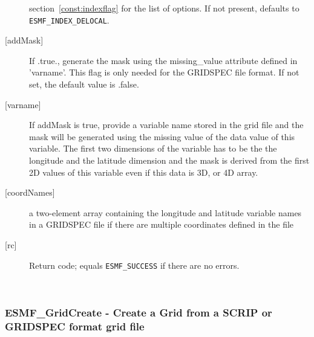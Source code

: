 \begin{description}
        section~\ref{const:indexflag} for the list of options. If not present,
        defaults to {\tt ESMF\_INDEX\_DELOCAL}.
   \item[{[addMask]}]
        If .true., generate the mask using the missing\_value attribute defined in 'varname'.
        This flag is only needed for the GRIDSPEC file format.  If not set, the default value is .false.
   \item[{[varname]}]
        If addMask is true, provide a variable name stored in the grid file and
        the mask will be generated using the missing value of the data value of
        this variable.  The first two dimensions of the variable has to be the
        the longitude and the latitude dimension and the mask is derived from the
        first 2D values of this variable even if this data is 3D, or 4D array.
  \item[{[coordNames]}]
        a two-element array containing the longitude and latitude variable names in a
        GRIDSPEC file if there are multiple coordinates defined in the file
   \item[{[rc]}]
        Return code; equals {\tt ESMF\_SUCCESS} if there are no errors.
   \end{description}
   
 
\mbox{}\hrulefill\ 
 

  \label{API:GridCreateFrmNCFile}\subsubsection [ESMF\_GridCreate] {ESMF\_GridCreate - Create a Grid from a SCRIP or GRIDSPEC format grid file}


